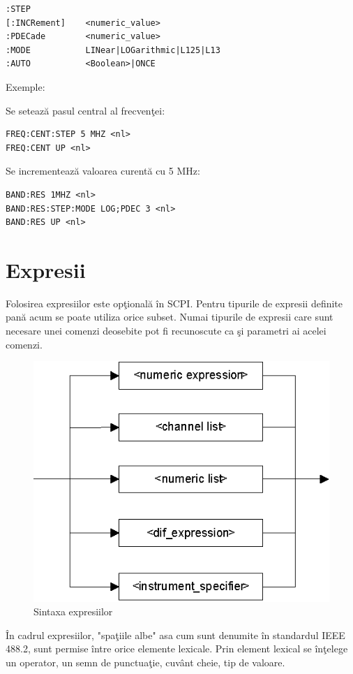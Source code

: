 \begin{verbatim}
:STEP
[:INCRement]	<numeric_value>
:PDECade		<numeric_value>
:MODE			LINear|LOGarithmic|L125|L13
:AUTO			<Boolean>|ONCE
\end{verbatim}

Exemple:

Se seteaz\u{a} pasul central al frecven\c{t}ei:
\begin{verbatim}
FREQ:CENT:STEP 5 MHZ <nl>
FREQ:CENT UP <nl>
\end{verbatim}

Se incrementeaz\u{a} valoarea curent\u{a} cu 5 MHz:
\begin{verbatim}
BAND:RES 1MHZ <nl>
BAND:RES:STEP:MODE LOG;PDEC 3 <nl>
BAND:RES UP <nl>
\end{verbatim}

\section{Expresii}
Folosirea expresiilor este op\c{t}ional\u{a} \^{i}n SCPI. Pentru tipurile de expresii definite pan\u{a} acum se poate utiliza orice subset. Numai tipurile de expresii care sunt necesare unei comenzi deosebite pot fi recunoscute ca \c{s}i parametri ai acelei comenzi.

\begin{figure}[htp]
 \centering
 \includegraphics[scale=1]{Figuri/scpi_ro_3.eps}
 \caption{Sintaxa expresiilor}
 \label{fig5}
\end{figure}

\^{I}n cadrul expresiilor, "spa\c{t}iile albe" asa cum sunt denumite \^{i}n standardul IEEE 488.2, sunt permise \^{i}ntre orice elemente lexicale. Prin element lexical se \^{i}n\c{t}elege un operator, un semn de punctua\c{t}ie, cuv\^{a}nt cheie, tip de valoare.

